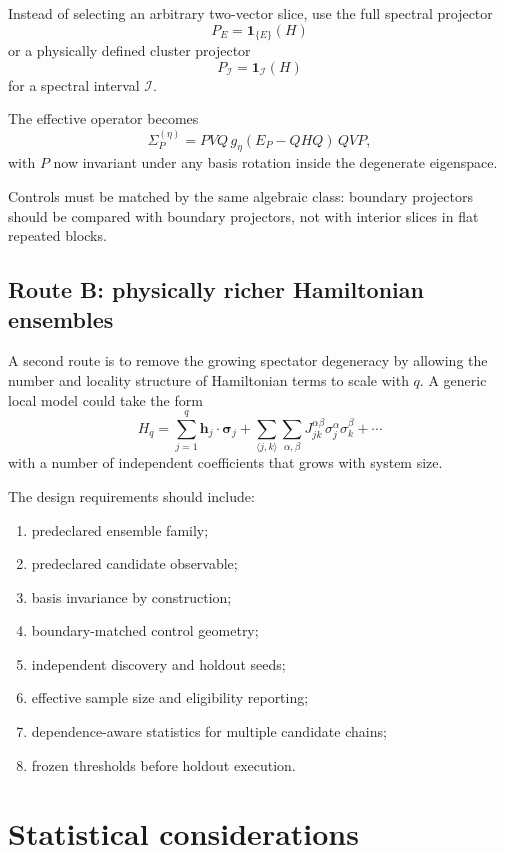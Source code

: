 \documentclass[11pt,a4paper]{article}
\begin{document}
Instead of selecting an arbitrary two-vector slice, use the full spectral
projector
\[
P_E
=
\mathbf 1_{\{E\}}(H)
\]
or a physically defined cluster projector
\[
P_{\mathcal I}
=
\mathbf 1_{\mathcal I}(H)
\]
for a spectral interval \(\mathcal I\).

The effective operator becomes
\[
\Sigma_{P}^{(\eta)}
=
PVQ\,g_\eta(E_P-QHQ)\,QVP,
\]
with \(P\) now invariant under any basis rotation inside the degenerate
eigenspace.

Controls must be matched by the same algebraic class: boundary projectors
should be compared with boundary projectors, not with interior slices in flat
repeated blocks.

\subsection{Route B: physically richer Hamiltonian ensembles}

A second route is to remove the growing spectator degeneracy by allowing the
number and locality structure of Hamiltonian terms to scale with \(q\).  A
generic local model could take the form
\[
H_q
=
\sum_{j=1}^{q}
\bm h_j\cdot\bm\sigma_j
+
\sum_{\langle j,k\rangle}
\sum_{\alpha,\beta}
J^{\alpha\beta}_{jk}
\sigma_j^\alpha\sigma_k^\beta
+\cdots
\]
with a number of independent coefficients that grows with system size.

The design requirements should include:

\begin{enumerate}[label=\arabic*.]
\item predeclared ensemble family;
\item predeclared candidate observable;
\item basis invariance by construction;
\item boundary-matched control geometry;
\item independent discovery and holdout seeds;
\item effective sample size and eligibility reporting;
\item dependence-aware statistics for multiple candidate chains;
\item frozen thresholds before holdout execution.
\end{enumerate}

\section{Statistical considerations}
\end{document}
